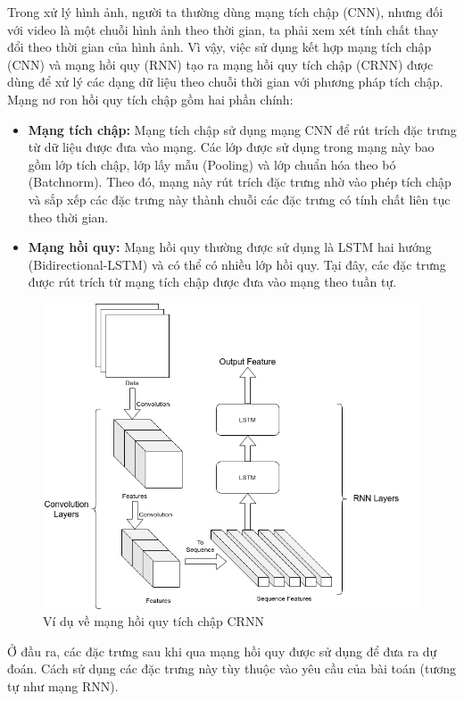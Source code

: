 Trong xử lý hình ảnh, người ta thường dùng mạng tích chập (CNN), nhưng đối với video là một chuỗi hình ảnh theo thời gian, ta phải xem xét tính chất thay đổi theo thời gian của hình ảnh. Vì vậy, việc sử dụng kết hợp mạng tích chập (CNN) và mạng hồi quy (RNN) tạo ra mạng hồi quy tích chập (CRNN) được dùng để xử lý các dạng dữ liệu theo chuỗi thời gian với phương pháp tích chập. Mạng nơ ron hồi quy tích chập gồm hai phần chính:

\begin{itemize}
    \item \textbf{Mạng tích chập:} Mạng tích chập sử dụng mạng CNN để rút trích đặc trưng từ dữ liệu được đưa vào mạng. Các lớp được sử dụng trong mạng này bao gồm lớp tích chập, lớp lấy mẫu (Pooling) và lớp chuẩn hóa theo bó (Batchnorm). Theo đó, mạng này rút trích đặc trưng nhờ vào phép tích chập và sắp xếp các đặc trưng này thành chuỗi các đặc trưng có tính chất liên tục theo thời gian.
    \item \textbf{Mạng hồi quy:} Mạng hồi quy thường được sử dụng là LSTM hai hướng (Bidirectional-LSTM) và có thể có nhiều lớp hồi quy. Tại đây, các đặc trưng được rút trích từ mạng tích chập được đưa vào mạng theo tuần tự.
\end{itemize}

\begin{figure}[H]
    \centering
    \includegraphics[width=13cm]{./content/materials/crnn.png}
    \caption{Ví dụ về mạng hồi quy tích chập CRNN}
\end{figure}

Ở đầu ra, các đặc trưng sau khi qua mạng hồi quy được sử dụng để đưa ra dự đoán. Cách sử dụng các đặc trưng này tùy thuộc vào yêu cầu của bài toán (tương tự như mạng RNN).

